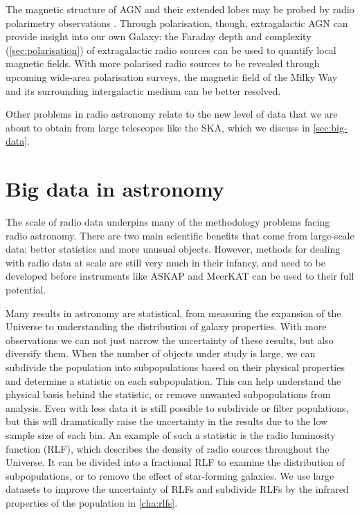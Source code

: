     The magnetic structure of AGN and their extended lobes may be probed by radio polarimetry observations \citep{anderson_broadband_2015,grant11polarised}. Through polarisation, though, extragalactic AGN can provide insight into our own Galaxy: the Faraday depth and complexity (\autoref{sec:polarisation}) of extragalactic radio sources can be used to quantify local magnetic fields. With more polarised radio sources to be revealed through upcoming wide-area polarisation surveys, the magnetic field of the Milky Way and its surrounding intergalactic medium can be better resolved.

    Other problems in radio astronomy relate to the new level of data that we are about to obtain from large telescopes like the SKA, which we discuss in \autoref{sec:big-data}.

\section{Big data in astronomy}
\label{sec:big-data}

    The scale of radio data underpins many of the methodology problems facing radio astronomy. There are two main scientific benefits that come from large-scale data: better statistics and more unusual objects. However, methods for dealing with radio data at scale are still very much in their infancy, and need to be developed before instruments like ASKAP and MeerKAT can be used to their full potential.

    Many results in astronomy are statistical, from measuring the expansion of the Universe to understanding the distribution of galaxy properties. With more observations we can not just narrow the uncertainty of these results, but also diversify them. When the number of objects under study is large, we can subdivide the population into subpopulations based on their physical properties and determine a statistic on each subpopulation. This can help understand the physical basis behind the statistic, or 
    remove unwanted subpopulations from analysis. Even with less data it is still possible to subdivide or filter populations, but this will dramatically raise the uncertainty in the results due to the low sample size of each bin. An example of such a statistic is the radio luminosity function (RLF), which describes the density of radio sources throughout the Universe. It can be divided into a fractional RLF to examine the distribution of subpopulations, or to remove the effect of star-forming galaxies. We use large datasets to improve the uncertainty of RLFs and subdivide RLFs by the infrared properties of the population in \autoref{cha:rlfs}.

